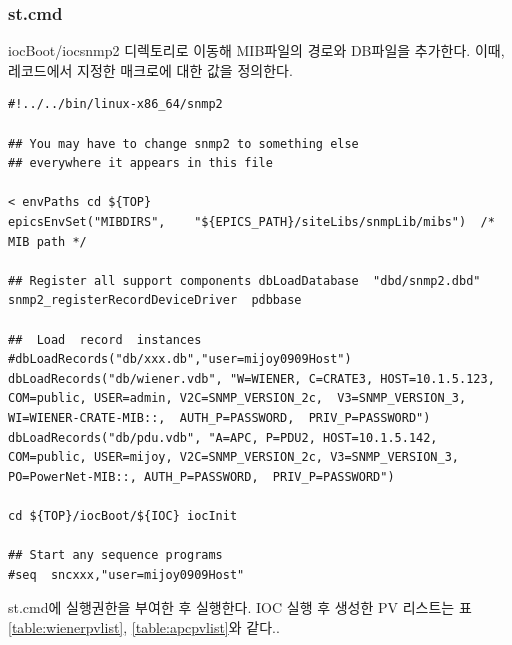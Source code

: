 \documentclass[11pt
  , a4paper
  , article
  , oneside
]{memoir}
\begin{document}
\subsubsection{st.cmd}
iocBoot/iocsnmp2 디렉토리로 이동해 MIB파일의 경로와 DB파일을 추가한다. 이때, 레코드에서 지정한 매크로에 대한 값을 정의한다.

{\scriptsize
\begin{lstlisting}[style=termstyle]
#!../../bin/linux-x86_64/snmp2

## You may have to change snmp2 to something else
## everywhere it appears in this file

< envPaths cd ${TOP}
epicsEnvSet("MIBDIRS",    "${EPICS_PATH}/siteLibs/snmpLib/mibs")  /* MIB path */

## Register all support components dbLoadDatabase  "dbd/snmp2.dbd" snmp2_registerRecordDeviceDriver  pdbbase

##  Load  record  instances
#dbLoadRecords("db/xxx.db","user=mijoy0909Host")
dbLoadRecords("db/wiener.vdb", "W=WIENER, C=CRATE3, HOST=10.1.5.123, COM=public, USER=admin, V2C=SNMP_VERSION_2c,  V3=SNMP_VERSION_3,  WI=WIENER-CRATE-MIB::,  AUTH_P=PASSWORD,  PRIV_P=PASSWORD")    
dbLoadRecords("db/pdu.vdb", "A=APC, P=PDU2, HOST=10.1.5.142, COM=public, USER=mijoy, V2C=SNMP_VERSION_2c, V3=SNMP_VERSION_3, PO=PowerNet-MIB::, AUTH_P=PASSWORD,  PRIV_P=PASSWORD")

cd ${TOP}/iocBoot/${IOC} iocInit

## Start any sequence programs
#seq  sncxxx,"user=mijoy0909Host"
\end{lstlisting}
}


st.cmd에 실행권한을 부여한 후 실행한다. IOC 실행 후 생성한 PV 리스트는 표\ref{table:wienerpvlist}, \ref{table:apcpvlist}와 같다.\cite{pvlist}.
\end{document}
